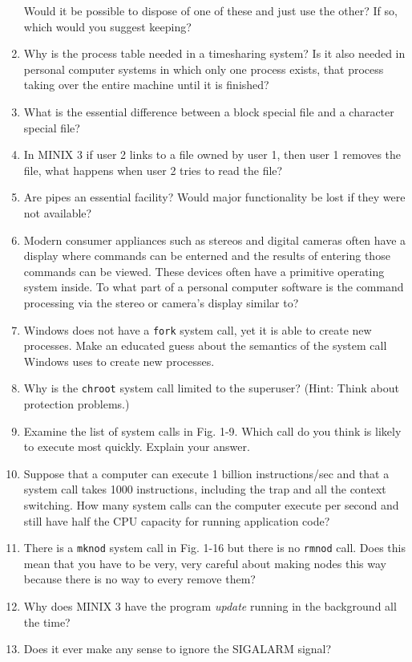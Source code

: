 \documentclass{book}
\newcommand {\sys} [1] {\textsl{#1}}
\newcommand {\cmd} [1] {\texttt{#1}}
\begin{document}
\begin{enumerate}
      Would it be possible to dispose of one of these and just use the other?
      If so, which would you suggest keeping?
\item Why is the process table needed in a timesharing system?
      Is it also needed in personal computer systems in which only one process exists,
      that process taking over the entire machine until it is finished?
\item What is the essential difference between a block special file and a character special file?
\item In MINIX 3 if user 2 links to a file owned by user 1, then user 1 removes the file, what happens when user 2 tries to read the file?
\item Are pipes an essential facility? Would major functionality be lost if they were not available?
\item Modern consumer appliances such as stereos and digital cameras often have a display 
      where commands can be enterned and the results of entering those commands can be viewed.
      These devices often have a primitive operating system inside.
      To what part of a personal computer software is the command processing via the stereo or camera's display similar to?
\item Windows does not have a \cmd{fork} system call, yet it is able to create new processes.
      Make an educated guess about the semantics of the system call Windows uses to create new processes.
\item Why is the \cmd{chroot} system call limited to the superuser? (Hint: Think about protection problems.)
\item Examine the list of system calls in Fig. 1-9.
      Which call do you think is likely to execute most quickly.
      Explain your answer.
\item Suppose that a computer can execute 1 billion instructions/sec and that a system call takes 1000 instructions,
      including the trap and all the context switching.
      How many system calls can the computer execute per second and still have half the CPU  capacity for running application code?
\item There is a \cmd{mknod} system call in Fig. 1-16 but there is no \cmd{rmnod} call.
      Does this mean that you have to be very, very careful about making nodes this way because there is no way to every remove them?
\item Why does MINIX 3 have the program \sys{update} running in the background all the time?
\item Does it ever make any sense to ignore the SIGALARM signal?

\end{enumerate}
\end{document}
